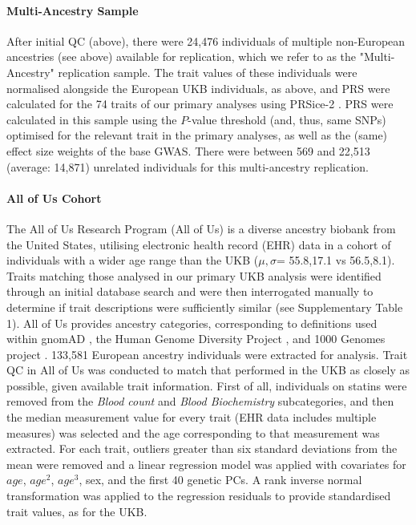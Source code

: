 \documentclass[12pt]{zHenriquesLab-StyleBioRxiv}
\begin{document}
\paragraph*{Multi-Ancestry Sample}
After initial QC (above), there were 24,476 individuals of multiple non-European ancestries (see above) 
available for replication, which we refer to as the "Multi-Ancestry" replication sample. The trait values of 
these individuals were normalised alongside the European UKB individuals, as above, and PRS 
were calculated for the 74 traits of our primary analyses using PRSice-2 \cite{prsice}. 
PRS were calculated in this sample using the $P$-value threshold (and, thus, same SNPs) 
optimised for the relevant trait in the primary analyses, as well as the (same) effect 
size weights of the base GWAS. There were between 569 and 22,513 (average: 14,871) unrelated 
individuals for this multi-ancestry replication. 

\paragraph*{All of Us Cohort}
The All of Us Research Program (All of Us) is a diverse ancestry biobank from the United States, utilising 
electronic health record (EHR) data in a cohort of individuals with a wider age 
range than the UKB ($\mu,\sigma$= 55.8,17.1 vs 56.5,8.1). 
Traits matching those analysed in our primary UKB analysis 
were identified through an initial database search and were 
then interrogated manually to determine if trait descriptions 
were sufficiently similar (see Supplementary Table 1).  
All of Us provides ancestry categories, corresponding to definitions 
used within gnomAD \cite{gnomad}, 
the Human Genome Diversity Project \cite{hgdp}, 
and 1000 Genomes project \cite{tgp}.  
133,581  European ancestry individuals were extracted for analysis. %
Trait QC in All of Us was conducted to match that performed in the UKB as closely as possible, given 
available trait information. First of all, individuals on statins were removed 
from the \textit{Blood count} and \textit{Blood Biochemistry} subcategories, and then the median measurement value for every trait (EHR data includes multiple measures) was selected and 
the age corresponding to that measurement was extracted. For each trait, outliers greater 
than six standard deviations from the mean were removed and a linear regression model was 
applied with covariates for $age$, $age^2$, $age^3$, sex, and the first 40 genetic PCs. A rank inverse normal transformation was applied to the regression residuals to provide standardised trait values, as for the UKB.
\end{document}
